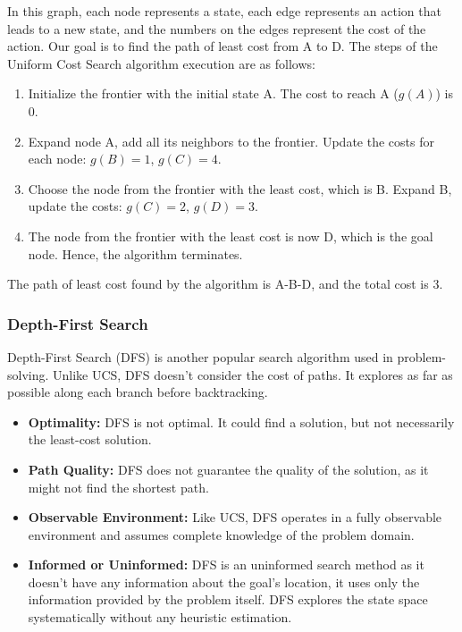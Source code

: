 \documentclass[a4paper,UKenglish,cleveref, autoref, thm-restate]{qlinhta}
\begin{document}
In this graph, each node represents a state, each edge represents an action that leads to a new state, and the numbers on the edges represent the cost of the action. Our goal is to find the path of least cost from A to D. The steps of the Uniform Cost Search algorithm execution are as follows:

\begin{enumerate}
  \item Initialize the frontier with the initial state A. The cost to reach A ($g(A)$) is 0.
  \item Expand node A, add all its neighbors to the frontier. Update the costs for each node: $g(B) = 1$, $g(C) = 4$.
  \item Choose the node from the frontier with the least cost, which is B. Expand B, update the costs: $g(C) = 2$, $g(D) = 3$.
  \item The node from the frontier with the least cost is now D, which is the goal node. Hence, the algorithm terminates.
\end{enumerate}

The path of least cost found by the algorithm is A-B-D, and the total cost is 3.

\subsubsection{Depth-First Search}

Depth-First Search (DFS) is another popular search algorithm used in problem-solving. Unlike UCS, DFS doesn't consider the cost of paths. It explores as far as possible along each branch before backtracking.

\begin{itemize}
\item \textbf{Optimality:} DFS is not optimal. It could find a solution, but not necessarily the least-cost solution.
\item \textbf{Path Quality:} DFS does not guarantee the quality of the solution, as it might not find the shortest path.
\item \textbf{Observable Environment:} Like UCS, DFS operates in a fully observable environment and assumes complete knowledge of the problem domain.
\item \textbf{Informed or Uninformed:} DFS is an uninformed search method as it doesn't have any information about the goal's location, it uses only the information provided by the problem itself. DFS explores the state space systematically without any heuristic estimation.
\end{itemize}
\end{document}
